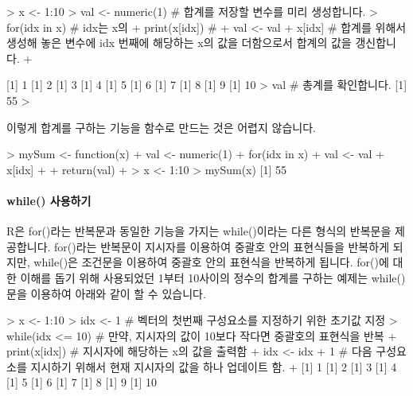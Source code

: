 \begin{Schunk}
\begin{Soutput}
> x <- 1:10
> val <- numeric(1)    # 합계를 저장할 변수를 미리 생성합니다.
> for(idx in x){       # idx는 x의 % 몇번째 구성요소를 나타내는 지시자입니다
+ print(x[idx])        # % idx번째에 해당하는 x의 값을 출력합니다 
+ val <- val + x[idx]  # 합계를 위해서 생성해 놓은 변수에 idx 번째에 해당하는 x의 값을 더함으로서 합계의 값을 갱신합니다.
+ }

% 첫 번째 줄에서 numeric()의 역할

[1] 1
[1] 2
[1] 3
[1] 4
[1] 5
[1] 6
[1] 7
[1] 8
[1] 9
[1] 10
> val                   # 총계를 확인합니다. 
[1] 55
> 
\end{Soutput}
\end{Schunk}

이렇게 합계를 구하는 기능을 함수로 만드는 것은 어렵지 않습니다.

\begin{Schunk}
\begin{Soutput}
> mySum <- function(x){
+ val <- numeric(1)
+ for(idx in x){
+ val <- val + x[idx]
+ }
+ return(val)
+ }
> x <- 1:10
> mySum(x)
[1] 55
\end{Soutput}
\end{Schunk}

\paragraph{while() 사용하기}
R은 for()라는 반복문과 동일한 기능을 가지는 while()이라는 다른 형식의 반복문을 제공합니다.
for()라는 반복문이 지시자를 이용하여 중괄호 안의 표현식들을 반복하게 되지만, while()은 조건문을 이용하여 중괄호 안의 표현식을 반복하게 됩니다. 
for()에 대한 이해를 돕기 위해 사용되었던 1부터 10사이의 정수의 합계를 구하는 예제는 while()문을 이용하여 아래와 같이 할 수 있습니다.

\begin{Schunk}
\begin{Soutput}
> x <- 1:10
> idx <- 1              # 벡터의 첫번째 구성요소를 지정하기 위한 초기값 지정 
> while(idx <= 10){     # 만약, 지시자의 값이 10보다 작다면 중괄호의 표현식을 반복 
+ print(x[idx])         # 지시자에 해당하는 x의 값을 출력함 
+ idx <- idx + 1        # 다음 구성요소를 지시하기 위해서 현재 지시자의 값을 하나 업데이트 함.
+ }
[1] 1
[1] 2
[1] 3
[1] 4
[1] 5
[1] 6
[1] 7
[1] 8
[1] 9
[1] 10

\end{Soutput}
\end{Schunk}

